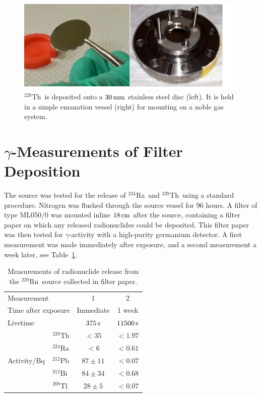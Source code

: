 \begin{figure}[htbp]
\centering
    \includegraphics[trim = 5 10 50 0, clip = true,width = 0.8\columnwidth]{figures/rnsource/source_image}
    \caption{$^{228}$Th~is deposited onto a $30\,\mathrm{mm}$ stainless steel disc (left). It is held in a simple emanation vessel (right) for mounting on a noble gas system.}\label{fig:th228source}
\end{figure}

\section{$\gamma$-Measurements of Filter Deposition}
\label{sec:tuv}

The source was tested
for the release of $^{224}$Ra~and $^{228}$Th~using a standard procedure. Nitrogen was flushed through the source vessel for 96 hours. A filter of type ML050/0 was mounted inline $18\,\mathrm{cm}$ after the source, containing a filter paper on which any released radionuclides could be deposited. This filter paper was then tested for $\gamma$-activity with a high-purity germanium detector. A first measurement was made immediately after exposure, and a second measurement a week later, see Table~\ref{tab:tuv}.

\begin{table}[htb]
\centering
    \caption{Measurements of radionuclide release from the $^{220}$Rn~source collected in filter paper.}
    \label{tab:tuv}
    \renewcommand{\arraystretch}{1.2}
    \begin{tabular}[c]{|llcc|}
        \hline\hline
        \multicolumn{2}{|l}{Measurement} & 1 & 2 \\
        \multicolumn{2}{|l}{Time after exposure} & Immediate & 1 week \\
        \multicolumn{2}{|l}{Livetime} & $375\,\mathrm{s}$ & $11500\,\mathrm{s}$ \\ \hline
        \multirow{5}{*}{Activity/Bq}
        & $^{228}$Th & $<35$ & $<1.97$ \\
        & $^{224}$Ra & $<6$ & $<0.61$ \\
        & $^{212}$Pb & $87\pm11$ & $<0.07$ \\
        & $^{212}$Bi & $84\pm34$ & $<0.68$ \\
        & $^{208}$Tl & $28\pm5$ & $<0.07$ \\
        \hline\hline
    \end{tabular}
\end{table}

